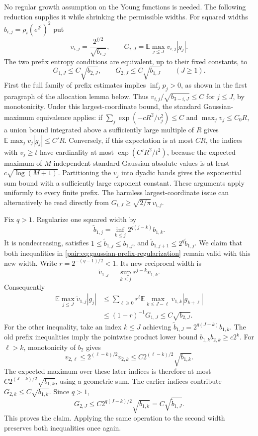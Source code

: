 \documentclass[11pt]{article}
\numberwithin{equation}{section}
\begin{document}
No regular growth assumption on the Young functions is needed. The
following reduction supplies it while shrinking the permissible widths.
For squared widths $b_{i,j}=\rho_i(e^{2^j})^2$ put
\[
 v_{i,j}=\frac{2^{j/2}}{\sqrt{b_{i,j}}},\qquad
 G_{i,J}=\mathbb E\max_{j\le J}v_{i,j}|g_j|.
\]
The two prefix entropy conditions are equivalent, up to their fixed
constants, to
\begin{equation}\label{pair:eq:gaussian-prefix-regularization}
 G_{1,J}\le C\sqrt{b_{2,J}},\qquad
 G_{2,J}\le C\sqrt{b_{1,J}}\qquad(J\ge1).
\end{equation}
First the full family of prefix estimates implies $\inf_jp_j>0$, as
shown in the first paragraph of the allocation lemma below. Thus
$v_{i,j}/\sqrt{b_{3-i,J}}\le C$ for $j\le J$, by monotonicity.
Under this largest-coordinate bound, the standard Gaussian-maximum
equivalence applies: if
$\sum_j\exp(-cR^2/v_j^2)\le C$ and $\max_jv_j\le C_0R$, a union bound
integrated above a sufficiently large multiple of $R$ gives
$\mathbb E\max_jv_j|g_j|\le C'R$. Conversely, if this expectation is
at most $CR$, the indices with $v_j\ge t$ have cardinality at most
$\exp(C'R^2/t^2)$, because the expected maximum of $M$ independent
standard Gaussian absolute values is at least $c\sqrt{\log(M+1)}$.
Partitioning the $v_j$ into dyadic bands gives the exponential sum bound
with a sufficiently large exponent constant. These arguments apply
uniformly to every finite prefix. The harmless largest-coordinate issue
can alternatively be read directly from
$G_{i,J}\ge\sqrt{2/\pi}\,v_{i,j}$.

Fix $q>1$. Regularize one squared width by
\begin{equation}\label{pair:eq:past-width-envelope}
 \widetilde b_{1,j}=\inf_{k\le j}2^{q(j-k)}b_{1,k}.
\end{equation}
It is nondecreasing, satisfies
$1\le\widetilde b_{1,j}\le b_{1,j}$, and
$\widetilde b_{1,j+1}\le2^q\widetilde b_{1,j}$.
We claim that both inequalities in
\eqref{pair:eq:gaussian-prefix-regularization} remain valid with this
new width. Write $r=2^{-(q-1)/2}<1$. Its new reciprocal width is
\[
 \widetilde v_{1,j}=\sup_{k\le j}r^{j-k}v_{1,k}.
\]
Consequently
\begin{align*}
 \mathbb E\max_{j\le J}\widetilde v_{1,j}|g_j|
 &\le\sum_{\ell\ge0}r^\ell
       \mathbb E\max_{k\le J-\ell}v_{1,k}|g_{k+\ell}|\\
 &\le(1-r)^{-1}G_{1,J}\le C\sqrt{b_{2,J}}.
\end{align*}
For the other inequality, take an index $k\le J$ achieving
$\widetilde b_{1,J}=2^{q(J-k)}b_{1,k}$. The old prefix inequalities
imply the pointwise product lower bound
$b_{1,k}b_{2,k}\ge c2^k$. For $\ell>k$, monotonicity of $b_2$ gives
\[
 v_{2,\ell}\le2^{(\ell-k)/2}v_{2,k}
                  \le C2^{(\ell-k)/2}\sqrt{b_{1,k}}.
\]
The expected maximum over these later indices is therefore at most
$C2^{(J-k)/2}\sqrt{b_{1,k}}$, using a geometric sum. The earlier
indices contribute $G_{2,k}\le C\sqrt{b_{1,k}}$. Since $q>1$,
\[
 G_{2,J}\le C2^{q(J-k)/2}\sqrt{b_{1,k}}
                         =C\sqrt{\widetilde b_{1,J}}.
\]
This proves the claim. Applying the same operation to the second width
preserves both inequalities once again.
\end{document}
